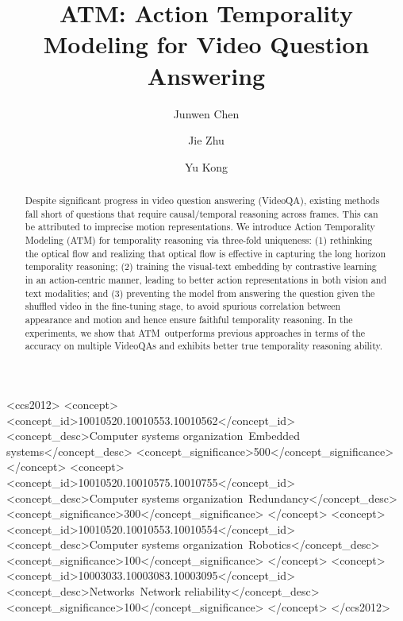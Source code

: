 \documentclass[sigconf]{acmart}
\newcommand{\methodname}{ATM~}
\begin{document}
\title{ATM: Action Temporality Modeling for Video Question Answering}

\author{Junwen Chen}

\author{Jie Zhu}

\author{Yu Kong}











\renewcommand{\shortauthors}{Junwen Chen, Jie Zhu, \& Yu Kong}


\begin{abstract}
Despite significant progress in video question answering (VideoQA), existing methods fall short of questions that require causal/temporal reasoning across frames. This can be attributed to imprecise motion representations.   
We introduce Action Temporality Modeling (ATM) for temporality reasoning via three-fold uniqueness: (1) rethinking the optical flow and realizing that optical flow is effective in capturing the long horizon temporality reasoning; (2) training the visual-text embedding by contrastive learning in an action-centric manner, leading to better action representations in both vision and text modalities; and (3) preventing the model from answering the question given the shuffled video in the fine-tuning stage, to avoid spurious correlation between appearance and motion and hence ensure faithful temporality reasoning. 
In the experiments, we show that \methodname outperforms previous approaches in terms of the accuracy on multiple VideoQAs and exhibits better true temporality reasoning ability.
\end{abstract}

\begin{CCSXML}
<ccs2012>
 <concept>
  <concept_id>10010520.10010553.10010562</concept_id>
  <concept_desc>Computer systems organization~Embedded systems</concept_desc>
  <concept_significance>500</concept_significance>
 </concept>
 <concept>
  <concept_id>10010520.10010575.10010755</concept_id>
  <concept_desc>Computer systems organization~Redundancy</concept_desc>
  <concept_significance>300</concept_significance>
 </concept>
 <concept>
  <concept_id>10010520.10010553.10010554</concept_id>
  <concept_desc>Computer systems organization~Robotics</concept_desc>
  <concept_significance>100</concept_significance>
 </concept>
 <concept>
  <concept_id>10003033.10003083.10003095</concept_id>
  <concept_desc>Networks~Network reliability</concept_desc>
  <concept_significance>100</concept_significance>
 </concept>
</ccs2012>
\end{CCSXML}
\end{document}

